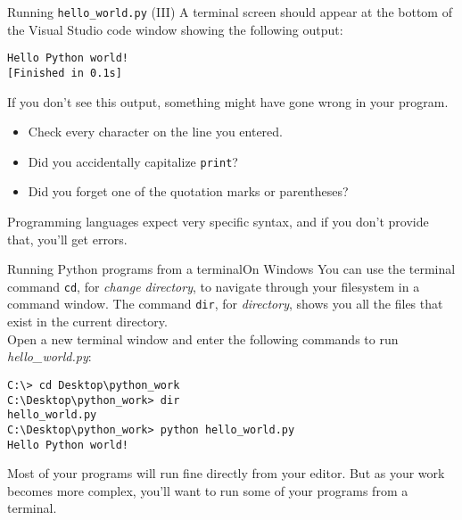 \documentclass[aspectratio=169]{beamer}
\begin{document}
\begin{frame}[fragile]{Running \texttt{hello\_world.py} (III)}
    A terminal screen should appear at the bottom of the Visual Studio code window showing the following output:
    \vspace{5pt}
    \begin{Verbatim}
Hello Python world!
[Finished in 0.1s]
    \end{Verbatim}
    \vspace{15pt}
    If you don't see this output, something might have gone wrong in your program.
        \begin{itemize}[label=\(\blacktriangleright\),itemsep=5pt]
            \item Check every character on the line you entered.
            \item Did you accidentally capitalize \texttt{print}?
            \item Did you forget one of the quotation marks or parentheses?\\
        \end{itemize}
    \vspace{15pt}
    Programming languages expect very specific syntax, and if you don't provide that, you'll get errors.
\end{frame}


\begin{frame}[fragile]{Running Python programs from a terminal}{On Windows}
    You can use the terminal command \texttt{cd}, for \textit{change directory}, to navigate through your filesystem in a command window.
    The command \texttt{dir}, for \textit{directory}, shows you all the files that exist in the current directory. \\
    \vspace{10pt}
    Open a new terminal window and enter the following commands to run \textit{hello\_world.py}:
    \vspace{5pt}
    \begin{Verbatim}
C:\> cd Desktop\python_work
C:\Desktop\python_work> dir
hello_world.py
C:\Desktop\python_work> python hello_world.py
Hello Python world!
    \end{Verbatim}
    \vspace{10pt}
    Most of your programs will run fine directly from your editor.
    But as your work becomes more complex, you'll want to run some of your programs from a terminal.
\end{frame}
\end{document}
